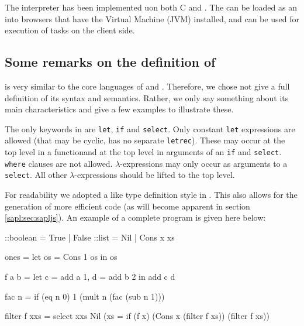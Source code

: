 The \Sapl interpreter has been implemented uon both \textsf{C} and \Java. The
\Java can be loaded as an into browsers that have the \Java Virtual Machine
(JVM) installed, and can be used for execution of \iTask tasks on the client
side.

\subsection{Some remarks on the definition of \Sapl}
\Sapl is very similar to the core languages of \Haskell and \Clean. 
Therefore, we chose not give a full definition of its syntax and semantics.
Rather, we only say something about its main characteristics and give a few
examples to illustrate these.

The only keywords in \Sapl are \texttt{let}, \texttt{if} and \texttt{select}.
Only constant \texttt{let} expressions are allowed (that may be cyclic, \Sapl
has no separate \texttt{letrec}). These may occur at the top level in a functionand at the top level in arguments of an \texttt{if} and \texttt{select}.
\texttt{where} clauses are not allowed. $\lambda$-expressions may only occur as 
arguments to a \texttt{select}. All other $\lambda$-expressions should be
lifted to the top level. 

For readability we adopted a \Clean like type definition style in \Sapl. This
also allows for the generation of more efficient code (as will become apparent
in section \ref{sapl:sec:sapljs}). An example of a complete \Sapl program is
given here below:

\begin{CleanCode}
::boolean = True | False
::list    = Nil  | Cons x xs
 
ones = let os = Cons 1 os
        in os 

f a b = let c = add a 1,
            d = add b 2
        in add c d

fac n = if (eq n 0) 1
                    (mult n
                          (fac (sub n 1)))

filter f xxs = select xxs Nil
                          (\x xs = if (f x) (Cons x
                                                  (filter f xs))
                                            (filter f xs))
\end{CleanCode}



